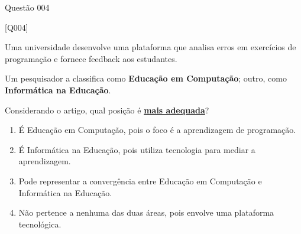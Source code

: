 \documentclass[xcolor=dvipsnames,table]{beamer}
\begin{document}
    \begin{frame}{Questão 004}

    \begin{block}{[Q004]}

        Uma universidade desenvolve uma plataforma que analisa erros em exercícios de programação e fornece feedback aos estudantes.

        Um pesquisador a classifica como \textbf{Educação em Computação}; outro, como \textbf{Informática na Educação}.

        Considerando o artigo, qual posição é \underline{\bf mais adequada}?

    \end{block}

    \begin{enumerate}[label=(\Alph*)]

        \item É Educação em Computação, pois o foco é a aprendizagem de programação.

        \item É Informática na Educação, pois utiliza tecnologia para mediar a aprendizagem.

        \item Pode representar a convergência entre Educação em Computação e Informática na Educação.

        \item Não pertence a nenhuma das duas áreas, pois envolve uma plataforma tecnológica.

    \end{enumerate}

\end{frame}
\end{document}
